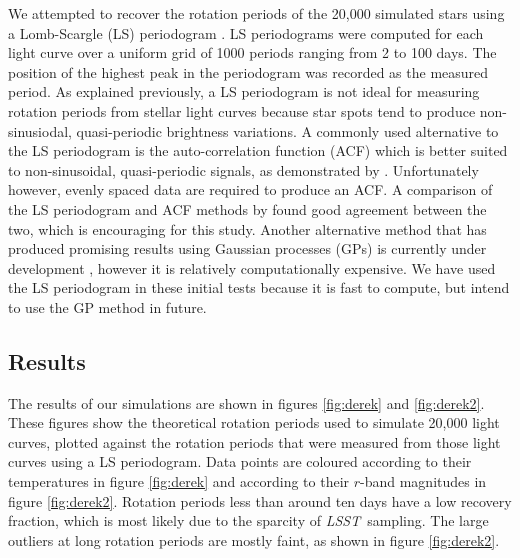 \documentclass[useAMS, usenatbib, preprint, 12pt]{aastex}
\newcommand{\LSST}{{\it LSST}}
\begin{document}
We attempted to recover the rotation periods of the 20,000 simulated stars
using a Lomb-Scargle (LS) periodogram \citep[][]{Lomb1976, Scargle1982}.
LS periodograms were computed for each light curve over a uniform grid of 1000
periods ranging from 2 to 100 days.
The position of the highest peak in the periodogram was recorded as the
measured period.
As explained previously, a LS periodogram is not ideal for measuring rotation
periods from stellar light curves because star spots tend to produce
non-sinusiodal, quasi-periodic brightness variations.
A commonly used alternative to the LS periodogram is the auto-correlation
function (ACF) which is better suited to non-sinusoidal, quasi-periodic
signals, as demonstrated by \citet{Mcquillan2013}.
Unfortunately however, evenly spaced data are required to produce an ACF.
A comparison of the LS periodogram and ACF methods by \citet{Aigrain2015b}
found good agreement between the two, which is encouraging for this study.
Another alternative method that has produced promising results using Gaussian
processes (GPs) is currently under development \citep{Angus2015b}, however it
is relatively computationally expensive.
We have used the LS periodogram in these initial tests because it is fast to
compute, but intend to use the GP method in future.

\subsection{Results}
\label{sec:LSST_results}

The results of our simulations are shown in figures \ref{fig:derek} and
\ref{fig:derek2}.
These figures show the theoretical rotation periods used to simulate 20,000
light curves, plotted against the rotation periods that were measured from
those light curves using a LS periodogram.
Data points are coloured according to their temperatures in figure
\ref{fig:derek} and according to their $r$-band magnitudes in figure
\ref{fig:derek2}.
Rotation periods less than around ten days have a low recovery fraction, which
is most likely due to the sparcity of \LSST\ sampling.
The large outliers at long rotation periods are mostly faint, as shown in
figure \ref{fig:derek2}.
\end{document}
